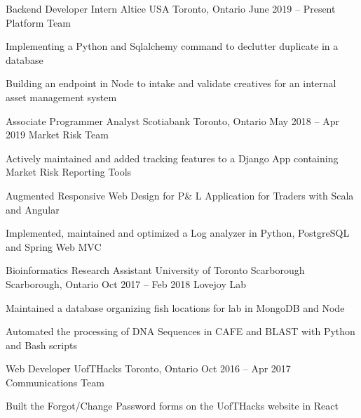 \begin{cventries}
  \cventry
    {Backend Developer Intern}
    {Altice USA}
    {Toronto, Ontario}
    {June 2019 -- Present}
    {Platform Team}
    {
    \begin{cvitems}
      \item {Implementing a Python and Sqlalchemy command to declutter duplicate in a database}
      \item {Building an endpoint in Node to intake and validate creatives for an internal asset management system}
    \end{cvitems}
    }
  \cventry
    {Associate Programmer Analyst}
    {Scotiabank}
    {Toronto, Ontario}
    {May 2018 -- Apr 2019}
    {Market Risk Team}
    {
      \begin{cvitems}
        \item {Actively maintained and added tracking features to a Django App containing Market Risk Reporting Tools}
        \item {Augmented Responsive Web Design for P\& L Application for Traders with Scala and Angular}
        \item {Implemented, maintained and optimized a Log analyzer in Python, PostgreSQL and Spring Web MVC}
      \end{cvitems}
    }

  \cventry
    {Bioinformatics Research Assistant}
    {University of Toronto Scarborough}
    {Scarborough, Ontario}
    {Oct 2017 -- Feb 2018}
    {Lovejoy Lab}
    {
      \begin{cvitems}
        \item {Maintained a database organizing fish locations for lab in MongoDB and Node}
        \item {Automated the processing of DNA Sequences in CAFE and BLAST with Python and Bash scripts}
      \end{cvitems}
    }
    \cventry
    {Web Developer}
    {UofTHacks}
    {Toronto, Ontario}
    {Oct 2016 -- Apr 2017}
    {Communications Team}
    {
      \begin{cvitems}
        \item {Built the Forgot/Change Password forms on the UofTHacks website in React}
      \end{cvitems}
    }
\end{cventries}
